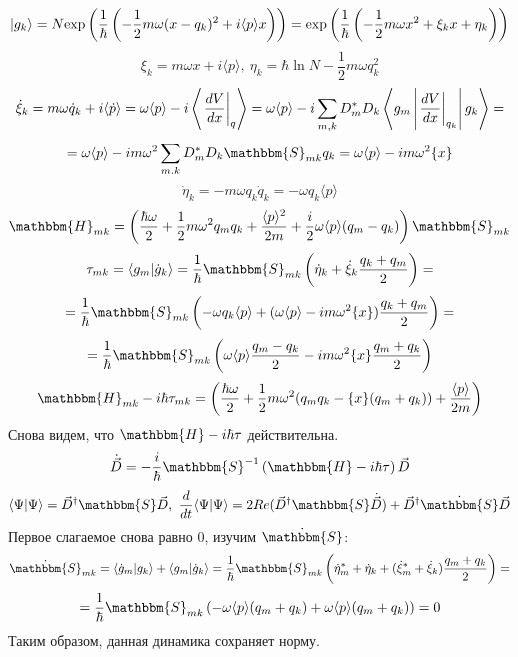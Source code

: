 $$|g_k\rangle=%
  N\myexp{\frac{1}{\hbar}\left(-\frac{1}{2}m\omega(x-q_k)^2+i\langle p\rangle x\right)}=%
  \myexp{\frac{1}{\hbar}\left(-\frac{1}{2}m\omega x^2 + \xi_k x + \eta_k\right)}$$
$$\xi_k = m\omega x + i\langle p\rangle,\ \eta_k = \hbar\ln N - \frac{1}{2}m\omega q_k^2$$
$$\dot{\xi}_k=m\omega\dot{q}_k+i\langle\dot{p}\rangle = %
              \omega\langle p\rangle - i \left\langle\left.\frac{dV}{dx}\right|_q\right\rangle=%
	      \omega\langle p\rangle - i\sum_{m,k}D_m^*D_k\mymean{g_m}{\left.\frac{dV}{dx}\right|_{q_k}}{g_k}=$$
$$=\omega\langle p\rangle - im\omega^2\sum_{m.k}D_m^*D_k\mathbbm{S}_{mk}q_k = %
   \omega\langle p\rangle - im\omega^2 \{x\}$$
$$\dot{\eta}_k = -m\omega q_k\dot{q}_k = -\omega q_k\langle p\rangle$$
$$\mathbbm{H}_{mk} = \left(\frac{\hbar\omega}{2} + %
			   \frac{1}{2}m\omega^2q_mq_k + %
			   \frac{\langle p\rangle^2}{2m} + %
			   \frac{i}{2}\omega\langle p\rangle(q_m-q_k)\right)\mathbbm{S}_{mk}$$
$$\tau_{mk}=\myint{g_m}{\dot{g}_k} = %
	    \frac{1}{\hbar}\mathbbm{S}_{mk}\left(\dot{\eta}_k+%
						 \dot{\xi}_k\frac{q_k+q_m}{2}\right) = $$
$$=\frac{1}{\hbar}\mathbbm{S}_{mk}\left(-\omega q_k\langle p\rangle + %
                          (\omega\langle p\rangle-im\omega^2\{x\})\frac{q_k+q_m}{2}\right) = $$
$$=\frac{1}{\hbar}\mathbbm{S}_{mk}\left(\omega\langle p\rangle\frac{q_m-q_k}{2} - %
			 im\omega^2\{x\}\frac{q_m+q_k}{2}\right)$$
$$\mathbbm{H}_{mk}-i\hbar\tau_{mk} = %
  \left(\frac{\hbar\omega}{2} + %
	\frac{1}{2}m\omega^2(q_mq_k-\{x\}(q_m+q_k)) + %
	\frac{\langle p\rangle}{2m}\right)$$
Снова видем, что $\mathbbm{H}-i\hbar\tau$ действительна. 
$$\dot{\vec{D}} = -\frac{i}{\hbar}\mathbbm{S}^{-1}\left(\mathbbm{H}-i\hbar\tau\right)\vec{D}$$
$$\myint{\Psi}{\Psi} = \vec{D}^{\dagger}\mathbbm{S}\vec{D},\ %
  \frac{d}{dt}\myint{\Psi}{\Psi} = 2Re(\vec{D}^{\dagger}\mathbbm{S}\dot{\vec{D}})+%
				   \vec{D}^{\dagger}\dot{\mathbbm{S}}\vec{D}$$
Первое слагаемое снова равно $0$, изучим $\dot{\mathbbm{S}}$:
$$\dot{\mathbbm{S}}_{mk} = \myint{\dot{g}_m}{g_k}+\myint{g_m}{\dot{g}_k} = %
  \frac{1}{\hbar}\mathbbm{S}_{mk}\left(\dot{\eta}_m^*+\dot{\eta}_k+%
					(\dot{\xi}_m^*+\dot{\xi}_k)\frac{q_m+q_k}{2}\right)=$$
$$= \frac{1}{\hbar}\mathbbm{S}_{mk}\left(-\omega\langle p\rangle(q_m+q_k) + %
					  \omega\langle p\rangle(q_m+q_k)\right) = 0$$
Таким образом, данная динамика сохраняет норму.

